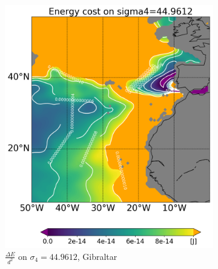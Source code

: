 \begin{figure}[htbp]
\begin{subfigure}[b]{0.4\textwidth}
         \includegraphics[width=\textwidth]{plots/energy/gibraltar_energy/Map2dcyl_energy_on_sigma4_4496e-2_reg310Eto360E05Nto57N_1990to1998av_WOCE.png}
         \caption{$\frac{\Delta E}{d^2}$ on $\sigma_4 = 44.9612$, Gibraltar}
         \label{fig:subplot_gibraltar_energy_sigma_4}
     \end{subfigure}
     \hfill
      \begin{subfigure}[b]{0.4\textwidth}
         

\end{subfigure}
\end{figure}
